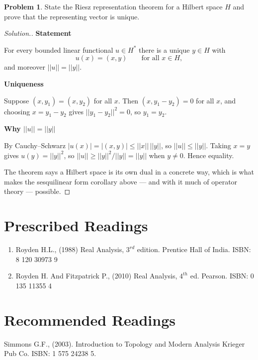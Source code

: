 \documentclass[11pt,a4paper]{article}
\theoremstyle{definition}
\newtheorem{problemx}{Problem}[section]
\newenvironment{problem}{\begin{problemx}}{\end{problemx}}
\newenvironment{solution}
  {\renewcommand{\qedsymbol}{}\begin{proof}[\textit{Solution}.]}
  {\end{proof}}
\newcommand{\subhead}[1]{%
  \par\medskip\noindent\textbf{#1}\par\nobreak\smallskip}
\begin{document}
\begin{problem}
State the Riesz representation theorem for a Hilbert space $H$ and prove that
the representing vector is unique.
\end{problem}
\begin{solution}
\subhead{Statement}
For every bounded linear functional $u\in H^*$ there is a unique $y\in H$ with
$$u(x)=(x,y)\qquad\text{for all }x\in H ,$$
and moreover $||u||=||y||$.

\subhead{Uniqueness}
Suppose $(x,y_1)=(x,y_2)$ for all $x$. Then $(x,y_1-y_2)=0$ for all $x$, and
choosing $x=y_1-y_2$ gives $||y_1-y_2||^2=0$, so $y_1=y_2$.

\subhead{Why $||u||=||y||$}
By Cauchy--Schwarz $|u(x)|=|(x,y)|\leq ||x||\,||y||$, so $||u||\leq||y||$.
Taking $x=y$ gives $u(y)=||y||^2$, so $||u||\geq ||y||^2/||y||=||y||$ when
$y\neq 0$. Hence equality.

The theorem says a Hilbert space is its own dual in a concrete way, which is
what makes the sesquilinear form corollary above --- and with it much of
operator theory --- possible.
\end{solution}

\section*{Prescribed Readings}

\begin{enumerate}
\item Royden H.L., (1988) Real Analysis, $3^{rd}$ edition. Prentice Hall of India. ISBN: 8 120 30973 9
\item Royden H. And Fitzpatrick P., (2010) Real Analysis, $4^{th}$ ed. Pearson. ISBN: 0 135 11355 4
\end{enumerate}

\section*{Recommended Readings}

Simmons G.F., (2003). Introduction to Topology and Modern Analysis Krieger Pub Co. ISBN: 1 575 24238 5.
\end{document}

